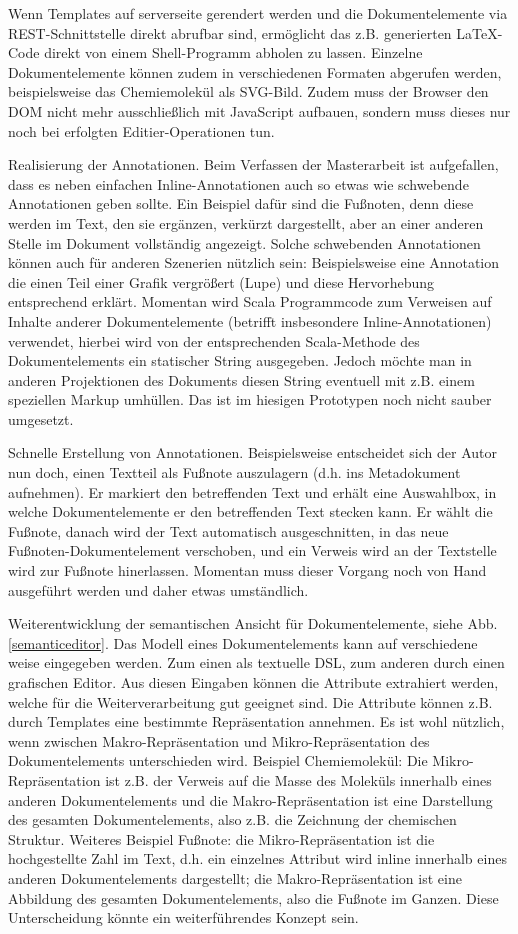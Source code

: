  
Wenn Templates auf serverseite gerendert werden und die Dokumentelemente via REST-Schnittstelle direkt abrufbar sind, ermöglicht das z.B. generierten LaTeX-Code direkt von einem Shell-Programm abholen zu lassen. Einzelne Dokumentelemente können zudem in verschiedenen Formaten abgerufen werden, beispielsweise das Chemiemolekül als SVG-Bild. Zudem muss der Browser den DOM nicht mehr ausschließlich mit JavaScript aufbauen, sondern muss dieses nur noch bei erfolgten Editier-Operationen tun.

 
Realisierung der Annotationen. Beim Verfassen der Masterarbeit ist aufgefallen, dass es neben einfachen Inline-Annotationen auch so etwas wie schwebende Annotationen geben sollte. Ein Beispiel dafür sind die Fußnoten, denn diese werden im Text, den sie ergänzen, verkürzt dargestellt, aber an einer anderen Stelle im Dokument vollständig angezeigt. Solche schwebenden Annotationen können auch für anderen Szenerien nützlich sein: Beispielsweise eine Annotation die einen Teil einer Grafik vergrößert (Lupe) und diese Hervorhebung entsprechend erklärt. Momentan wird Scala Programmcode zum Verweisen auf Inhalte anderer Dokumentelemente (betrifft insbesondere Inline-Annotationen) verwendet, hierbei wird von der entsprechenden Scala-Methode des Dokumentelements ein statischer String ausgegeben. Jedoch möchte man in anderen Projektionen des Dokuments diesen String eventuell mit z.B. einem speziellen Markup umhüllen. Das ist im hiesigen Prototypen noch nicht sauber umgesetzt.

 
Schnelle Erstellung von Annotationen. Beispielsweise entscheidet sich der Autor nun doch, einen Textteil als Fußnote auszulagern (d.h. ins Metadokument aufnehmen). Er markiert den betreffenden Text und erhält eine Auswahlbox, in welche Dokumentelemente er den betreffenden Text stecken kann. Er wählt die Fußnote, danach wird der Text automatisch ausgeschnitten, in das neue Fußnoten-Dokumentelement verschoben, und ein Verweis wird an der Textstelle wird zur Fußnote hinerlassen. Momentan muss dieser Vorgang noch von Hand ausgeführt werden und daher etwas umständlich.

 
Weiterentwicklung der semantischen Ansicht für Dokumentelemente, siehe Abb. \ref{semanticeditor}. Das Modell eines Dokumentelements kann auf verschiedene weise eingegeben werden. Zum einen als textuelle DSL, zum anderen durch einen grafischen Editor. Aus diesen Eingaben können die Attribute extrahiert werden, welche für die Weiterverarbeitung gut geeignet sind. Die Attribute können z.B. durch Templates eine bestimmte Repräsentation annehmen. Es ist wohl nützlich, wenn zwischen Makro-Repräsentation und Mikro-Repräsentation des Dokumentelements unterschieden wird. Beispiel Chemiemolekül: Die Mikro-Repräsentation ist z.B. der Verweis auf die Masse des Moleküls innerhalb eines anderen Dokumentelements und die Makro-Repräsentation ist eine Darstellung des gesamten Dokumentelements, also z.B. die Zeichnung der chemischen Struktur. Weiteres Beispiel Fußnote: die Mikro-Repräsentation ist die hochgestellte Zahl im Text, d.h. ein einzelnes Attribut wird inline innerhalb eines anderen Dokumentelements dargestellt; die Makro-Repräsentation ist eine Abbildung des gesamten Dokumentelements, also die Fußnote im Ganzen. Diese Unterscheidung könnte ein weiterführendes Konzept sein.

